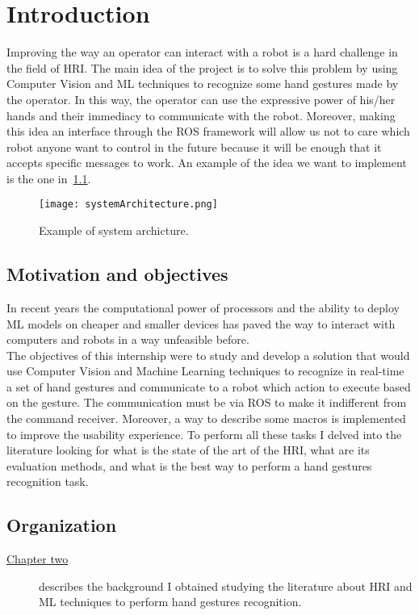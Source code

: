 \documentclass[../thesis.tex]{subfiles}
\begin{document}
\chapter{Introduction}\label{cap:introduction}
Improving the way an operator can interact with a robot is a hard challenge in the field of \acrfull{HRI}. The main idea of the project is to solve this problem by using Computer Vision and \acrfull{ML} techniques to recognize some hand gestures made by the operator. In this way, the operator can use the expressive power of his/her hands and their immediacy to communicate with the robot. Moreover, making this idea an interface through the \acrfull{ROS} framework will allow us not to care which robot anyone want to control in the future because it will be enough that it accepts specific messages to work. An example of the idea we want to implement is the one in~\ref{fig:systemArchitecture}.

\begin{figure}[H]
  \centering
  \texttt{[image: systemArchitecture.png]}
  \caption{Example of system archicture.}
  \label{fig:systemArchitecture}
\end{figure}

\section{Motivation and objectives}\label{s:motivation-and-objectives}
In recent years the computational power of processors and the ability to deploy \acrshort{ML} models on cheaper and smaller devices has paved the way to interact with computers and robots in a way unfeasible before.\\

The objectives of this internship were to study and develop a solution that would use Computer Vision and Machine Learning techniques to recognize in real-time a set of hand gestures and communicate to a robot which action to execute based on the gesture. The communication must be via \acrshort{ROS} to make it indifferent from the command receiver. Moreover, a way to describe some \glspl{macro} is implemented to improve the usability experience. To perform all these tasks I delved into the literature looking for what is the state of the art of the \acrshort{HRI}, what are its evaluation methods, and what is the best way to perform a hand gestures recognition task.

\section{Organization}\label{s:organization}
\begin{description}
    \item[{\hyperref[cap:background]{Chapter two}}] describes the background I obtained studying the literature about \acrshort{HRI} and \acrshort{ML} techniques to perform hand gestures recognition.
\end{description}
\end{document}
